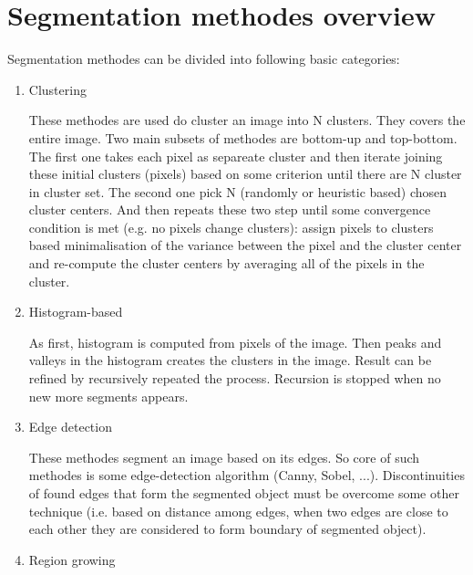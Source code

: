 \section{Segmentation methodes overview}

Segmentation methodes can be divided into following basic categories:

\begin{enumerate}

  \item Clustering

  These methodes are used do cluster an image into N clusters. They covers the entire image. Two main subsets of methodes are bottom-up and top-bottom. The first one takes each pixel as separeate cluster and then iterate joining these initial clusters (pixels) based on some criterion until there are N cluster in cluster set. The second one pick N (randomly or heuristic based) chosen cluster centers. And then repeats these two step until some convergence condition is met (e.g. no pixels change clusters): assign pixels to clusters based minimalisation of the variance between the pixel and the cluster center and re-compute the cluster centers by averaging all of the pixels in the cluster. 

  \item Histogram-based

  As first, histogram is computed from pixels of the image. Then peaks and valleys in the histogram creates the clusters in the image. Result can be refined by recursively repeated the process. Recursion is stopped when no new more segments appears.

  \item Edge detection

  These methodes segment an image based on its edges. So core of such methodes is some edge-detection algorithm (Canny, Sobel, ...). Discontinuities of found edges that form the segmented object must be overcome some other technique (i.e. based on distance among edges, when two edges are close to each other they are considered to form boundary of segmented object).

  \item Region growing


\end{enumerate}
